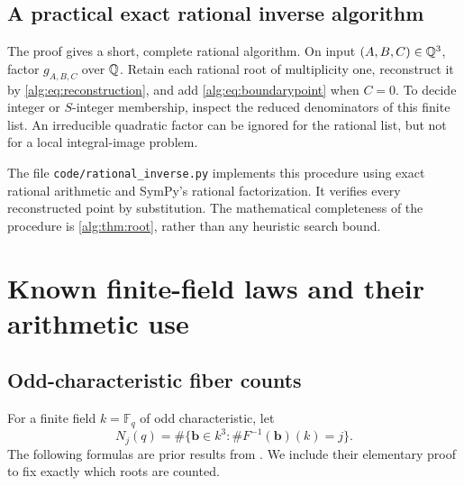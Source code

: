 \documentclass[11pt]{article}
\numberwithin{equation}{section}
\theoremstyle{plain}
\theoremstyle{plain}
\theoremstyle{plain}
\theoremstyle{definition}
\theoremstyle{definition}
\theoremstyle{definition}
\theoremstyle{remark}
\newcommand{\F}{\mathbb F}\newcommand{\A}{\mathbb A}\newcommand{\PP}{\mathbb P}
\newcommand{\target}{\boldsymbol b}
\begin{document}
\subsection{A practical exact rational inverse algorithm}
The proof gives a short, complete rational algorithm. On input
$(A,B,C)\in\mathbb Q^3$, factor $g_{A,B,C}$ over $\mathbb Q$. Retain each rational
root of multiplicity one, reconstruct it by \eqref{alg:eq:reconstruction},
and add \eqref{alg:eq:boundarypoint} when $C=0$. To decide integer or
$S$-integer membership, inspect the reduced denominators of this finite
list. An irreducible quadratic factor can be ignored for the rational
list, but not for a local integral-image problem.

The file \texttt{code/rational\_inverse.py} implements this procedure
using exact rational arithmetic and SymPy's rational factorization.
It verifies every reconstructed point by substitution. The mathematical
completeness of the procedure is \cref{alg:thm:root}, rather than any
heuristic search bound.

\section{Known finite-field laws and their arithmetic use}\label{alg:sec:finitefields}

\subsection{Odd-characteristic fiber counts}
For a finite field $k=\F_q$ of odd characteristic, let
\[
 N_j(q)=\#\{\target\in k^3:\#F^{-1}(\target)(k)=j\}.
\]
The following formulas are prior results from \cite{finitefield}.
We include their elementary proof to fix exactly which roots are counted.
\end{document}
